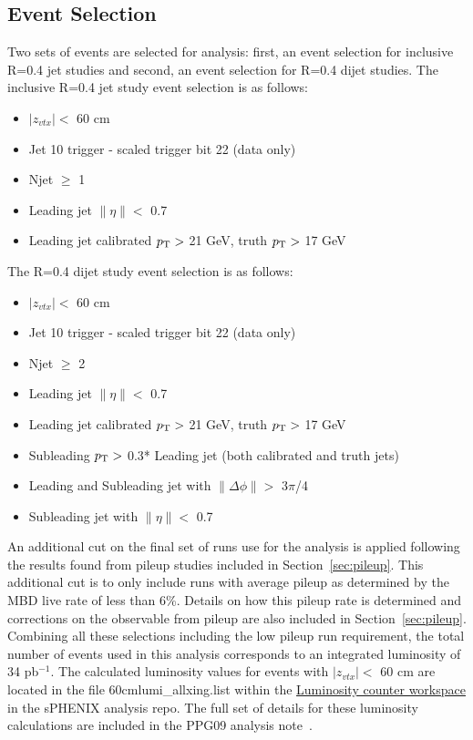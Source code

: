 \subsection{Event Selection}
Two sets of events are selected for analysis: first, an event selection for inclusive R=0.4 jet studies and second, an event selection for R=0.4 dijet studies.
The inclusive R=0.4 jet study event selection is as follows: 
\begin{itemize}
    \item $|z_{vtx}| <$ 60 cm
    \item Jet 10 trigger - scaled trigger bit 22 (data only)
    \item Njet $\geq$ 1
    \item Leading jet $\|\eta\| <$ 0.7
    \item Leading jet calibrated $\mbox{$p_{\text{T}}$} >$ 21 GeV, truth $\mbox{$p_{\text{T}}$} >$ 17 GeV
\end{itemize}

The R=0.4 dijet study event selection is as follows: 
\begin{itemize}
    \item $|z_{vtx}| <$ 60 cm
    \item Jet 10 trigger - scaled trigger bit 22 (data only)
    \item Njet $\geq$ 2
    \item Leading jet $\|\eta\| <$ 0.7
    \item Leading jet calibrated $\mbox{$p_{\text{T}}$} >$ 21 GeV, truth $\mbox{$p_{\text{T}}$} >$ 17 GeV
    \item Subleading $\mbox{$p_{\text{T}}$} >$ 0.3* Leading jet \pT (both calibrated and truth jets)
    \item Leading and Subleading jet with $\|\Delta\phi\| >$ 3$\pi$/4
    \item Subleading jet with $\|\eta\| <$ 0.7
\end{itemize}

An additional cut on the final set of runs use for the analysis is applied following the results found from pileup studies included in Section~\ref{sec:pileup}. This additional cut is to only include runs with average pileup as determined by the MBD live rate of less than 6\%. Details on how this pileup rate is determined and corrections on the observable from pileup are also included in Section~\ref{sec:pileup}.
Combining all these selections including the low pileup run requirement, the total number of events used in this analysis corresponds to an integrated luminosity of 34 pb$^{-1}$. 
The calculated luminosity values for events with $|z_{vtx}| <$ 60 cm are located in the file 60cmlumi\_allxing.list within the \href{https://github.com/sPHENIX-Collaboration/analysis/tree/master/LuminosityCounterGoodRuns/run}{Luminosity counter workspace} in the sPHENIX analysis repo. The full set of details for these luminosity calculations are included in the PPG09 analysis note~\cite{ppg09AN}.